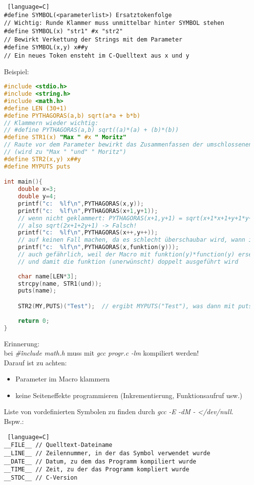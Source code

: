 \begin{lstlisting} [language=C]
#define SYMBOL(<parameterlist>)	Ersatztokenfolge
// Wichtig: Runde Klammer muss unmittelbar hinter SYMBOL stehen
#define SYMBOL(x) "str1" #x "str2"
// Bewirkt Verkettung der Strings mit dem Parameter
#define SYMBOL(x,y) x##y
// Ein neues Token ensteht im C-Quelltext aus x und y
\end{lstlisting}
Beispiel:
\begin{lstlisting}[language=C]
#include <stdio.h>
#include <string.h>
#include <math.h>
#define LEN (30+1)
#define PYTHAGORAS(a,b) sqrt(a*a + b*b)
// Klammern wieder wichtig:
// #define PYTHAGORAS(a,b) sqrt((a)*(a) + (b)*(b))
#define STR1(x) "Max " #x " Moritz"
// Raute vor dem Parameter bewirkt das Zusammenfassen der umschlossenen Strings.
// (wird zu "Max " "und" " Moritz")
#define STR2(x,y) x##y
#define MYPUTS puts

int main(){
	double x=3;
	double y=4;
	printf("c:  %lf\n",PYTHAGORAS(x,y));	
	printf("c:  %lf\n",PYTHAGORAS(x+1,y+1));	
	// wenn nicht geklammert: PYTHAGORAS(x+1,y+1) = sqrt(x+1*x+1+y+1*y+1)
	// also sqrt(2x+1+2y+1) -> Falsch!
	printf("c:  %lf\n",PYTHAGORAS(x++,y++));
	// auf keinen Fall machen, da es schlecht überschaubar wird, wann inkrementiert wird!
	printf("c:  %lf\n",PYTHAGORAS(x,funktion(y)));
	// auch gefährlich, weil der Macro mit funktion(y)*function(y) ersetzt wird
	// und damit die funktion (unerwünscht) doppelt ausgeführt wird
	
	char name[LEN*3];
	strcpy(name, STR1(und));
	puts(name);

	STR2(MY,PUTS)("Test");	// ergibt MYPUTS("Test"), was dann mit puts() ersetzt wird.
	
	return 0;
}
\end{lstlisting}
Erinnerung:\\
bei \emph{\#\. include math.h} muss mit \emph{gcc progr.c -lm} kompiliert werden!\\
Darauf ist zu achten:
\begin{itemize}
\item Parameter im Macro klammern
\item keine Seiteneffekte programmieren (Inkrementierung, Funktionsaufruf usw.)
\end{itemize}
Liste von vordefinierten Symbolen zu finden durch \emph{gcc -E -dM - </dev/null}.\\
Bspw.:
\begin{lstlisting} [language=C]
__FILE__ // Quelltext-Dateiname
__LINE__ // Zeilennummer, in der das Symbol verwendet wurde
__DATE__ // Datum, zu dem das Programm kompiliert wurde
__TIME__ // Zeit, zu der das Programm kompliert wurde
__STDC__ // C-Version
\end{lstlisting}

